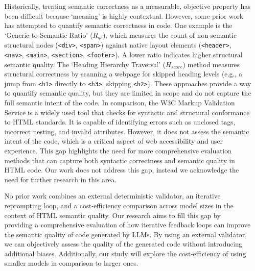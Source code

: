 Historically, treating semantic correctness as a measurable, objective property has been difficult because `meaning' is highly contextual. However, some prior work has attempted to quantify semantic correctness in code. One example is the `Generic-to-Semantic Ratio' ($R_{gs}$), which measures the count of non-semantic structural nodes (\verb|<div>|, \verb|<span>|) against native layout elements (\verb|<header>|, \verb|<nav>|, \verb|<main>|, \verb|<section>|, \verb|<footer>|). A lower ratio indicates higher structural semantic quality. The `Heading Hierarchy Traversal' ($H_{score}$) method measures structural correctness by scanning a webpage for skipped heading levels (e.g., a jump from \verb|<h1>| directly to \verb|<h3>|, skipping \verb|<h2>|). These approaches provide a way to quantify semantic quality, but they are limited in scope and do not capture the full semantic intent of the code. In comparison, the W3C Markup Validation Service is a widely used tool that checks for syntactic and structural conformance to HTML standards. It is capable of identifying errors such as unclosed tags, incorrect nesting, and invalid attributes. However, it does not assess the semantic intent of the code, which is a critical aspect of web accessibility and user experience. This gap highlights the need for more comprehensive evaluation methods that can capture both syntactic correctness and semantic quality in HTML code. Our work does not address this gap, instead we acknowledge the need for further research in this area.



No prior work combines an external deterministic validator, an iterative reprompting loop, and a cost-efficiency comparison across model sizes in the context of HTML semantic quality. Our research aims to fill this gap by providing a comprehensive evaluation of how iterative feedback loops can improve the semantic quality of code generated by LLMs. By using an external validator, we can objectively assess the quality of the generated code without introducing additional biases. Additionally, our study will explore the cost-efficiency of using smaller models in comparison to larger ones.
